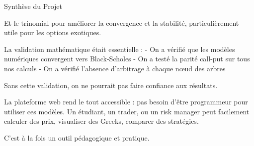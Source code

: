 \documentclass[aspectratio=169, 10pt]{beamer}
\begin{document}
\begin{frame}{Synthèse du Projet}
{        Et le trinomial pour améliorer la convergence et la stabilité,
        particulièrement utile pour les options exotiques.
        
        La validation mathématique était essentielle :
        - On a vérifié que les modèles numériques convergent vers Black-Scholes
        - On a testé la parité call-put sur tous nos calculs
        - On a vérifié l'absence d'arbitrage à chaque nœud des arbres
        
        Sans cette validation, on ne pourrait pas faire confiance aux résultats.
        
        La plateforme web rend le tout accessible :
        pas besoin d'être programmeur pour utiliser ces modèles.
        Un étudiant, un trader, ou un risk manager peut facilement
        calculer des prix, visualiser des Greeks, comparer des stratégies.
        
        C'est à la fois un outil pédagogique et pratique.
    }
\end{frame}
\end{document}
